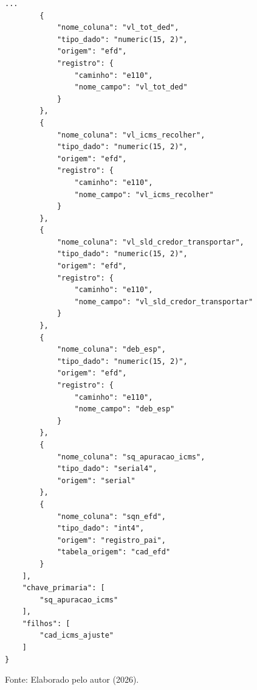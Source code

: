 \begin{quadro}[H]
    \centering
    \begin{lstlisting}[basicstyle=\ttfamily\footnotesize, frame=single]
        ...
        {
            "nome_coluna": "vl_tot_ded",
            "tipo_dado": "numeric(15, 2)",
            "origem": "efd",
            "registro": {
                "caminho": "e110",
                "nome_campo": "vl_tot_ded"
            }
        },
        {
            "nome_coluna": "vl_icms_recolher",
            "tipo_dado": "numeric(15, 2)",
            "origem": "efd",
            "registro": {
                "caminho": "e110",
                "nome_campo": "vl_icms_recolher"
            }
        },
        {
            "nome_coluna": "vl_sld_credor_transportar",
            "tipo_dado": "numeric(15, 2)",
            "origem": "efd",
            "registro": {
                "caminho": "e110",
                "nome_campo": "vl_sld_credor_transportar"
            }
        },
        {
            "nome_coluna": "deb_esp",
            "tipo_dado": "numeric(15, 2)",
            "origem": "efd",
            "registro": {
                "caminho": "e110",
                "nome_campo": "deb_esp"
            }
        },
        {
            "nome_coluna": "sq_apuracao_icms",
            "tipo_dado": "serial4",
            "origem": "serial"
        },
        {
            "nome_coluna": "sqn_efd",
            "tipo_dado": "int4",
            "origem": "registro_pai",
            "tabela_origem": "cad_efd"
        }
    ],
    "chave_primaria": [
        "sq_apuracao_icms"
    ],
    "filhos": [
        "cad_icms_ajuste"
    ]
}
    \end{lstlisting}

    \vspace{0.2cm}
    \small{Fonte: Elaborado pelo autor (2026).}
\end{quadro}
